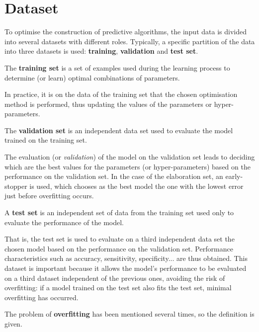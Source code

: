 \section{Dataset}\label{dataset}

To optimise the construction of predictive algorithms, the input data is divided into several datasets with different roles. Typically, a specific partition of the data into three datasets is used: \textbf{training}, \textbf{validation} and \textbf{test set}.


\begin{defi}
    The \textbf{training set} is a set of examples used during the learning process to determine (or learn) optimal combinations of parameters.
\end{defi}

In practice, it is on the data of the training set that the chosen optimisation method is performed, thus updating the values of the parameters or hyper-parameters.

\begin{defi}
    The \textbf{validation set} is an independent data set used to evaluate the model trained on the training set.
\end{defi}
The evaluation (or \textit{validation}) of the model on the validation set leads to deciding which are the best values for the parameters (or hyper-parameters) based on the performance on the validation set. In the case of the elaboration set, an early-stopper is used, which chooses as the best model the one with the lowest error just before overfitting occurs.

\begin{defi}
    A \textbf{test set} is an independent set of data from the training set used only to evaluate the performance of the model.
\end{defi}

\newpage

That is, the test set is used to evaluate on a third independent data set the chosen model based on the performance on the validation set. Performance characteristics such as accuracy, sensitivity, specificity... are thus obtained. This dataset is important because it allows the model's performance to be evaluated on a third dataset independent of the previous ones, avoiding the risk of overfitting: if a model trained on the test set also fits the test set, minimal overfitting has occurred.

The problem of \textbf{overfitting} has been mentioned several times, so the definition is given.

